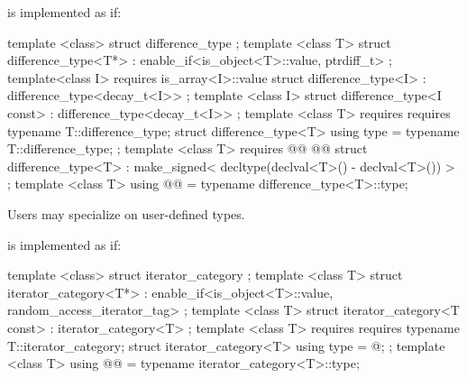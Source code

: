 \begin{addedblock}
\pnum
{}%
 is implemented as if:

%
\begin{codeblock}
  template <class> struct difference_type { };
  template <class T>
  struct difference_type<T*>
    : enable_if<is_object<T>::value, ptrdiff_t> { };
  template<class I>
    requires is_array<I>::value
  struct difference_type<I> : difference_type<decay_t<I>> { };
  template <class I>
  struct difference_type<I const> : difference_type<decay_t<I>> { };
  template <class T>
    requires requires { typename T::difference_type; }
  struct difference_type<T> {
    using type = typename T::difference_type;
  };
  template <class T>
    requires @@
      @@
  struct difference_type<T>
    : make_signed< decltype(declval<T>() - declval<T>()) > {
  };
  template <class T>
    using @@ = typename difference_type<T>::type;
\end{codeblock}


\pnum
Users may specialize  on user-defined types.

\pnum
{}%
is implemented as if:

%
\begin{codeblock}
  template <class> struct iterator_category { };
  template <class T>
  struct iterator_category<T*>
    : enable_if<is_object<T>::value, random_access_iterator_tag> { };
  template <class T>
  struct iterator_category<T const> : iterator_category<T> { };
  template <class T>
    requires requires { typename T::iterator_category; }
  struct iterator_category<T> {
    using type = @\seebelow@;
  };
  template <class T>
    using @@ = typename iterator_category<T>::type;
\end{codeblock}


\end{addedblock}
